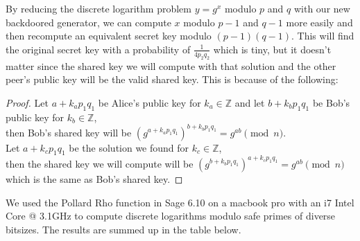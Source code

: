 \documentclass[a4paper,11pt,twocolumn]{article}
\begin{document}
\begin{center}
\end{center}

By reducing the discrete logarithm problem $y = g^x$ modulo $p$ and $q$ with our new backdoored generator, we can compute $x$ modulo $p-1$ and $q-1$ more easily and then recompute an equivalent secret key modulo $(p-1)(q-1)$. This will find the original secret key with a probability of $\frac{1}{4p_2q_2}$ which is tiny, but it doesn't matter since the shared key we will compute with that solution and the other peer's public key will be the valid shared key. This is because of the following:
\begin{proof}
Let $a + k_ap_1q_1$ be Alice's public key for $k_a \in \mathbb{Z}$ and let $b + k_bp_1q_1$ be Bob's public key for $k_b \in \mathbb{Z}$,\\
then Bob's shared key will be $(g^{a+k_ap_1q_1})^{b+k_bp_1q_1} = g^{ab} \pmod{n}$.\\
Let $a + k_cp_1q_1$ be the solution we found for $k_c \in \mathbb{Z}$,\\
then the shared key we will compute will be $(g^{b+k_bp_1q_1})^{a+k_cp_1q_1} = g^{ab}\pmod{n}$ which is the same as Bob's shared key.
\end{proof}
We used the Pollard Rho function in Sage 6.10 on a macbook pro with an i7 Intel Core @ 3.1GHz to compute discrete logarithms modulo safe primes of diverse bitsizes. The results are summed up in the table below.
\end{document}
